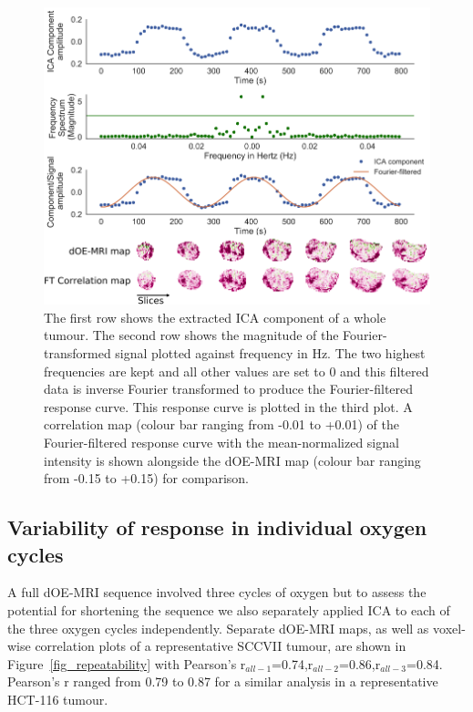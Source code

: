 \begin{figure}[htbp]
   \centering
   \includegraphics[width=\textwidth]{oemri_thesis1/oemri_thesis1-images/final_FT.png} %
   \caption{The first row shows the extracted ICA component of a whole tumour. The second row shows the magnitude of the Fourier-transformed signal plotted against frequency in Hz. The two highest frequencies are kept and all other values are set to 0 and this filtered data is inverse Fourier transformed to produce the Fourier-filtered response curve. This response curve is plotted in the third plot. A correlation map (colour bar ranging from -0.01 to +0.01) of the Fourier-filtered response curve with the mean-normalized signal intensity is shown alongside the \acs{dOE-MRI} map (colour bar ranging from -0.15 to +0.15) for comparison.  
   \label{fig_FT}}
\end{figure}

\subsection{Variability of response in individual oxygen cycles}
\label{res3}

A full \acs{dOE-MRI} sequence involved three cycles of oxygen but to assess the potential for shortening the sequence we also separately applied \acs{ICA} to each of the three oxygen cycles independently.
Separate \acs{dOE-MRI} maps, as well as voxel-wise correlation plots of a representative SCCVII tumour, are shown in Figure~\ref{fig_repeatability} with Pearson's r$_{all-1}$=0.74,r$_{all-2}$=0.86,r$_{all-3}$=0.84.
Pearson's r ranged from 0.79 to 0.87 for a similar analysis in a representative HCT-116 tumour.

